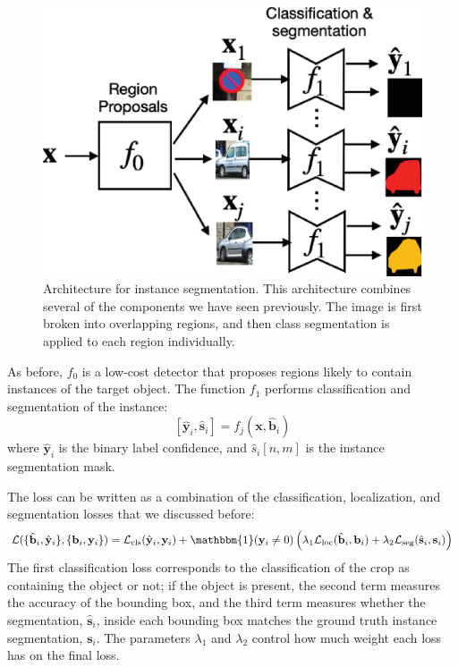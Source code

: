 \begin{figure}
\centerline{
\includegraphics[width=0.5\linewidth]{figures/object_recognition/instance_segmentation_architecture.eps}
}
\caption{Architecture for instance segmentation. This architecture combines several of the components we have seen previously. The image is first broken into overlapping regions, and then class segmentation is applied to each region individually.}
\label{fig:instance_segmentation_architecture}
\end{figure}
As before, $f_0$ is a low-cost detector that proposes regions likely to contain instances of the target object. The function $f_1$ performs classification and segmentation of the instance:
\begin{equation}
    \left[\hat{\mathbf{y}}_i,   \hat{\mathbf{s}}_i \right]= f_j(\mathbf{x}, \hat{\mathbf{b}}_i) 
\end{equation}
where $\hat{\mathbf{y}}_i$ is the binary label confidence, and $\hat{s}_i \left[ n,m \right]$ is the instance segmentation mask. 

The loss can be written as a combination of the classification, localization, and segmentation losses that we discussed before:
\begin{equation}
    \mathcal{L}( \{\hat{\mathbf{b}}_i, \hat{\mathbf{y}}_i\}, \{\mathbf{b}_i, \mathbf{y}_i\})
     =  \mathcal{L}_{\text{cls}}(\hat{\mathbf{y}}_i, \mathbf{y}_i) +
     \mathbbm{1} (\mathbf{y}_i \neq 0)
     \left( 
     \lambda_1 \mathcal{L}_{\text{loc}} (\hat{\mathbf{b}}_i, \mathbf{b}_i)
     +
     \lambda_2 \mathcal{L}_{\text{seg}} (\hat{\mathbf{s}}_i, \mathbf{s}_i)
     \right)
\end{equation}
The first classification loss corresponds to the classification of the crop as containing the object or not; if the object is present, the second term measures the accuracy of the bounding box, and the third term measures whether the segmentation, $\hat{\mathbf{s}}_i$,  inside each bounding box matches the ground truth instance segmentation, $\mathbf{s}_i$. The parameters $\lambda_1$ and $\lambda_2$ control how much weight each loss has on the final loss. 

